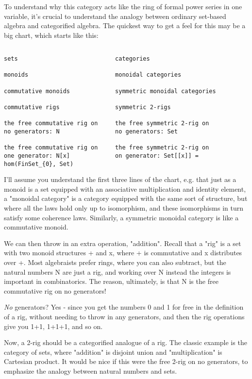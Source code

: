 To understand why this category acts like the ring of formal
power series in one variable, it's crucial to understand the 
analogy between ordinary set-based algebra and categorified 
algebra.  The quickest way to get a feel for this may be a big 
chart, which starts like this:


\begin{verbatim}

sets                            categories

monoids                         monoidal categories

commutative monoids             symmetric monoidal categories

commutative rigs                symmetric 2-rigs

the free commutative rig on     the free symmetric 2-rig on
no generators: N                no generators: Set

the free commutative rig on     the free symmetric 2-rig on
one generator: N[x]             on generator: Set[[x]] = hom(FinSet_{0}, Set) 
\end{verbatim}
    
I'll assume you understand the first three lines of the chart,
e.g. that just as a monoid is a set equipped with an associative
multiplication and identity element, a "monoidal category" is
a category equipped with the same sort of structure, but where 
all the laws hold only up to isomorphism, and these isomorphisms
in turn satisfy some coherence laws.  Similarly, a symmetric 
monoidal category is like a commutative monoid.  

We can then throw in an extra operation, "addition".  Recall that 
a "rig" is a set with two monoid structures + and x, where + is 
commutative and x distributes over +.  Most algebraists prefer
rings, where you can also subtract, but the natural numbers N are
just a rig, and working over N instead the integers is important in 
combinatorics.
The reason, ultimately, is that N is the free commutative rig on no 
generators!  

\emph{No} generators?  Yes - since you get the numbers 0 and 1 
for free in the definition of a rig, without needing to throw in any 
generators, and then the rig operations give you 1+1, 1+1+1, and so on.


Now, a 2-rig should be a categorified analogue of a rig.  The classic
example is the category of sets, where "addition" is disjoint
union and "multiplication" is Cartesian product.  It would be
nice if this were the free 2-rig on no generators, to emphasize the
analogy between natural numbers and sets.



